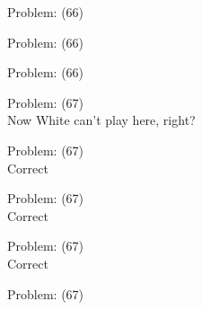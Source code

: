 \documentclass[11pt]{article}
\begin{document}
\begin{minipage}[t]{0.5\textwidth}
  {\centering
  
  Problem: (66)\\
  
  }
\end{minipage}
\begin{minipage}[t]{0.5\textwidth}
  {\centering
  
  Problem: (66)\\
  
  }
\end{minipage}
\begin{minipage}[t]{0.5\textwidth}
  {\centering
  
  Problem: (66)\\
  
  }
\end{minipage}
\begin{minipage}[t]{0.5\textwidth}
  {\centering
  
  Problem: (67)\\
  Now White can't play here, right?\\
  }
\end{minipage}
\begin{minipage}[t]{0.5\textwidth}
  {\centering
  
  Problem: (67)\\
  Correct\\
  }
\end{minipage}
\begin{minipage}[t]{0.5\textwidth}
  {\centering
  
  Problem: (67)\\
  Correct\\
  }
\end{minipage}
\begin{minipage}[t]{0.5\textwidth}
  {\centering
  
  Problem: (67)\\
  Correct\\
  }
\end{minipage}
\begin{minipage}[t]{0.5\textwidth}
  {\centering
  
  Problem: (67)\\
  
  }
\end{minipage}
\end{document}
